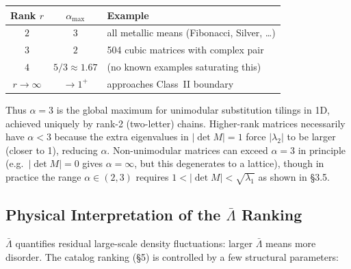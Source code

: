 \documentclass[11pt,letterpaper]{article}
\begin{document}
\medskip
\noindent\begin{tabular}{ccl}
\toprule
\textbf{Rank $r$} & $\alpha_{\max}$ & \textbf{Example} \\
\midrule
$2$ & $3$ & all metallic means (Fibonacci, Silver, \ldots) \\
$3$ & $2$ & 504 cubic matrices with complex pair \\
$4$ & $5/3 \approx 1.67$ & (no known examples saturating this) \\
$r \to \infty$ & $\to 1^+$ & approaches Class~II boundary \\
\bottomrule
\end{tabular}

\medskip\noindent
Thus $\alpha = 3$ is the global maximum for unimodular substitution tilings in 1D,
achieved uniquely by rank-2 (two-letter) chains. Higher-rank matrices necessarily
have $\alpha < 3$ because the extra eigenvalues in $|\det M| = 1$ force $|\lambda_2|$
to be larger (closer to 1), reducing $\alpha$. Non-unimodular matrices can exceed $\alpha = 3$
in principle (e.g.\ $|\det M| = 0$ gives $\alpha = \infty$, but this degenerates to a lattice),
though in practice the range $\alpha \in (2,3)$ requires $1 < |\det M| < \sqrt{\lambda_1}$
as shown in §3.5.

\subsection{Physical Interpretation of the $\bar\Lambda$ Ranking}

$\bar\Lambda$ quantifies residual large-scale density fluctuations: larger $\bar\Lambda$
means more disorder. The catalog ranking (§5) is controlled by a few
structural parameters:
\end{document}
